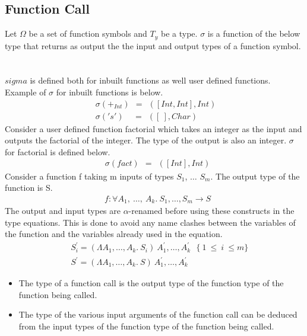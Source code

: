 \documentclass[11pt]{article}
\begin{document}
\subsection {Function Call}
Let $\Omega$ be a set of function symbols and $T_y$ be a type. $\sigma$ is a function of the below type that returns as output the the input and output types of a function symbol.
~~\\~~\\
$sigma$ is defined both for inbuilt functions as well user defined functions.
Example of $\sigma$ for inbuilt functions is below. 
\begin{align*}
    & \sigma (+_{Int}) ~~ = ~~ ([Int,Int],Int) ~~\\ 
    & \sigma ('s') ~~~~~ = ~~ ([~],Char)
\end{align*}
Consider a user defined function factorial which takes an integer as the input and outputs the factorial of the integer. The type of the output is also an integer. $\sigma$ for factorial is defined below.
\begin{align*}
    & \sigma (fact) ~~ = ~~ ([Int],Int)  
\end{align*}
Consider a function f taking m inputs of types $S_1$, $\ldots$ $S_m$. The output type of the function is S. 
\begin{align*} 
 & f:\forall A_1,~ \ldots,~A_k.~S_1,\ldots,S_m \to S 
\end{align*}
The output and input types are $\alpha$-renamed before using these constructs in the type equations. This is done to avoid any name clashes between the variables of the function and the variables already used in the equation.
\begin{align*}
 & ~~ S_{i}^\prime = (\Lambda A_1,\ldots,A_k.~S_i)~A_1^{\prime},\ldots,A_k^{\prime} ~~~ \{~ 1~ \leq~ i~ \leq m\} \\
 & ~~ S^{\prime} = (\Lambda A_1,\ldots,A_k.~ S)~A_1^{\prime},\ldots,A_k^{\prime} 
 \end{align*}
\begin{itemize}
   \item The type of a function call is the output type of the function type of the function being called.
   \item The type of the various input arguments of the function call can be  deduced from the input types of the function type of the function being called.
 \end{itemize} 
\end{document}

